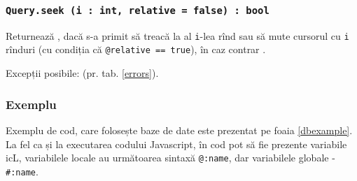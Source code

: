\subsubsection{\texttt{Query.seek (i : int, relative = false) : bool}}

Returnează \true, dacă s-a primit să treacă la al \texttt{i}-lea rînd sau să mute cursorul cu \texttt{i} rînduri (cu condiția că \texttt{@relative == true}), în caz contrar \false.

Excepții posibile:  (pr. tab. \ref{errors}).

\subsubsection{Exemplu}

Exemplu de cod, care folosește baze de date este prezentat pe foaia \ref{dbexample}. La fel ca și la executarea codului Javascript, în cod pot să fie prezente variabile icL, variabilele locale au următoarea sintaxă \texttt{@:name}, dar variabilele globale - \texttt{#:name}.

\newpage
\begin{sourcecode}
\label{dbexample}
\inputminted[linenos]{icl}{../sources/dbexample.icL}
\end{sourcecode}

